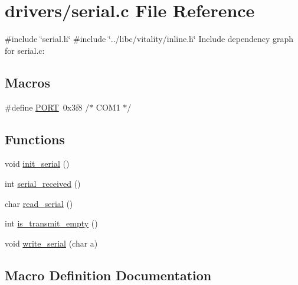 \hypertarget{a00050}{}\section{drivers/serial.c File Reference}
\label{a00050}
{\ttfamily \#include \char`\"{}serial.\+h\char`\"{}}\newline
{\ttfamily \#include \char`\"{}../libc/vitality/inline.\+h\char`\"{}}\newline
Include dependency graph for serial.\+c\+:
\subsection*{Macros}
\begin{DoxyCompactItemize}
\item 
\#define \hyperlink{a00050_a614217d263be1fb1a5f76e2ff7be19a2_a614217d263be1fb1a5f76e2ff7be19a2}{P\+O\+RT}~0x3f8   /$\ast$ C\+O\+M1 $\ast$/
\end{DoxyCompactItemize}
\subsection*{Functions}
\begin{DoxyCompactItemize}
\item 
void \hyperlink{a00050_acfb6f6d615183fc2f71e79dfbadfe27d_acfb6f6d615183fc2f71e79dfbadfe27d}{init\+\_\+serial} ()
\item 
int \hyperlink{a00050_af10f0e64ba89e8635aa7245ca08297c5_af10f0e64ba89e8635aa7245ca08297c5}{serial\+\_\+received} ()
\item 
char \hyperlink{a00050_ad343a7018f74662f794968dfa0523841_ad343a7018f74662f794968dfa0523841}{read\+\_\+serial} ()
\item 
int \hyperlink{a00050_a01fe5504f7b8f4eee1545737495bae76_a01fe5504f7b8f4eee1545737495bae76}{is\+\_\+transmit\+\_\+empty} ()
\item 
void \hyperlink{a00050_aac3c84e21fffc4696d8969ca6955bfc8_aac3c84e21fffc4696d8969ca6955bfc8}{write\+\_\+serial} (char a)
\end{DoxyCompactItemize}


\subsection{Macro Definition Documentation}
\mbox{\label{a00050_a614217d263be1fb1a5f76e2ff7be19a2_a614217d263be1fb1a5f76e2ff7be19a2}} 
